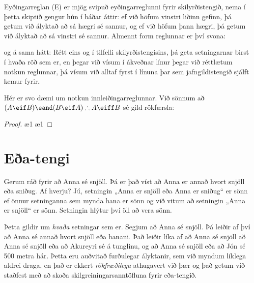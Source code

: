 Eyðingarreglan ({\eiff}E) er mjög svipuð eyðingarreglunni fyrir skilyrðistengið, nema í þetta skiptið gengur hún í báðar áttir: ef við höfum vinstri liðinn gefinn, þá getum við ályktað að sá hægri sé sannur, og ef við höfum þann hægri, þá getum við ályktað að sá vinstri sé sannur. Almennt form reglunnar er því svona:

og á sama hátt:
Rétt eins og í tilfelli skilyrðistengisins, þá geta setningarnar birst í hvaða röð sem er, en þegar við vísum í ákveðnar línur þegar við réttlætum notkun reglunnar, þá vísum við alltaf fyrst í línuna þar sem jafngildistengið sjálft kemur fyrir.

Hér er svo dæmi um notkun innleiðingarreglunnar. Við sönnum að $(A \eif B) \eand (B \eif A) \therefore A \eiff B$ sé gild rökfærsla:

\begin{proof}
 \ae{1}
\ae{1}
\open
{}
 
\close
\open
{}
\close
{} 
\end{proof}

\section{Eða-tengi}

Gerum ráð fyrir að Anna sé snjöll. Þá er það víst að Anna er annað hvort snjöll eða sniðug. Af hverju? Jú, setningin „Anna er snjöll eða Anna er sniðug“ er sönn ef önnur setninganna sem mynda hana er sönn og við vitum að setningin „Anna er snjöll“ er sönn. Setningin hlýtur því öll að vera sönn.

Þetta gildir um \emph{hvaða} setningar sem er. Segjum að Anna sé snjöll. Þá leiðir af því að Anna sé annað hvort snjöll eða banani. Það leiðir líka af að Anna sé snjöll að Anna sé snjöll eða að Akureyri sé á tunglinu, og að Anna sé snjöll eða að Jón sé 500 metra hár. Þetta eru auðvitað furðulegar ályktanir, sem við myndum líklega aldrei draga, en það er ekkert \emph{rökfræðilega} athugavert við þær og það getum við staðfest með að skoða skilgreiningarsanntöfluna fyrir eða-tengið.

